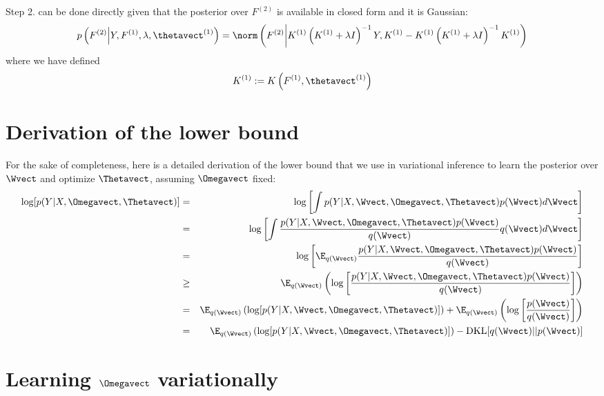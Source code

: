 Step 2. can be done directly given that the posterior over $F^{(2)}$ is available in closed form and it is Gaussian:
$$
p\left(F^{(2)} \middle| Y, F^{(1)}, \lambda, \thetavect^{(1)}\right) = \norm
\left(F^{(2)} \middle| 
K^{(1)} \left(K^{(1)} + \lambda I\right)^{-1} Y,
K^{(1)} - K^{(1)} \left(K^{(1)} + \lambda I\right)^{-1} K^{(1)}
\right)
$$
where we have defined
$$
K^{(1)} := K\left(F^{(1)}, \thetavect^{(1)}\right)
$$





\section{Derivation of the lower bound}

For the sake of completeness, here is a detailed derivation of the lower bound that we use in variational inference to learn the posterior over $\Wvect$ and optimize $\Thetavect$, assuming $\Omegavect$ fixed:
\begin{eqnarray}
\log [p(Y | X, \Omegavect, \Thetavect)] & = & \log\left[ \int p(Y | X, \Wvect, \Omegavect, \Thetavect) p(\Wvect) d \Wvect \right] \nonumber \\
& = & \log\left[ \int \frac{p(Y | X, \Wvect, \Omegavect, \Thetavect) p(\Wvect)}{q(\Wvect)} q(\Wvect) d\Wvect \right] \nonumber \\
& = & \log\left[ \E_{q(\Wvect)} \frac{p(Y | X, \Wvect, \Omegavect, \Thetavect) p(\Wvect)}{q(\Wvect)} \right] \nonumber \\
& \geq & \E_{q(\Wvect)} \left( \log\left[ \frac{p(Y | X, \Wvect, \Omegavect, \Thetavect) p(\Wvect)}{q(\Wvect)} \right] \right) \nonumber \\
& = & \E_{q(\Wvect)} \left( \log[ p(Y | X, \Wvect, \Omegavect, \Thetavect) ] \right) + \E_{q(\Wvect)} \left( \log\left[\frac{ p(\Wvect)}{q(\Wvect)} \right] \right) \nonumber \\
& = & \E_{q(\Wvect)} \left( \log[ p(Y | X, \Wvect, \Omegavect, \Thetavect) ] \right) - \mathrm{DKL}[q(\Wvect) || p(\Wvect)] \nonumber
\end{eqnarray}

\section{Learning $\Omegavect$ variationally}

